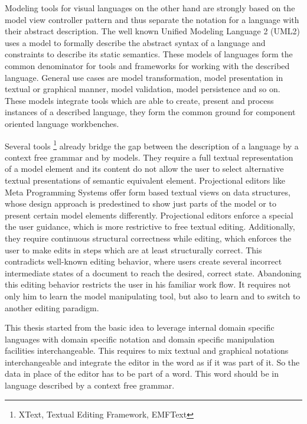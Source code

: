 Modeling tools for visual languages on the other hand are strongly based on the model view controller pattern and thus separate the notation for a language with their abstract description. The well known Unified Modeling Language 2 (UML2) uses a model to formally describe the abstract syntax of a language and constraints to describe its static semantics. These models of languages form the common denominator for tools and frameworks for working with the described language. General use cases are model transformation, model presentation in textual or graphical manner, model validation, model persistence and so on. These models integrate tools which are able to create, present and process instances of a described language, they form the common ground for component oriented language workbenches. 

Several tools \footnote{\raggedright XText, Textual Editing Framework, EMFText} already bridge the gap between the description of a language by a context free grammar and by models. They require a full textual representation of a model element and its content do not allow the user to select alternative textual presentations of semantic equivalent element. Projectional editors like Meta Programming Systems offer form based textual views on data structures, whose design approach is 	 predestined to show just parts of the model or to present certain model elements differently. Projectional editors enforce a special the user guidance, which is more restrictive to free textual editing. Additionally, they require continuous structural correctness while editing, which enforces the user to make edits in steps which are at least structurally correct. This contradicts well-known editing behavior, where users create several incorrect intermediate states of a document to reach the desired, correct state. Abandoning this editing behavior restricts the user in his familiar work flow. It requires not only him to learn the model manipulating tool, but also to learn and to switch to another editing paradigm. 

This thesis started from the basic idea to leverage internal domain specific languages with domain specific notation and domain specific manipulation facilities interchangeable. This requires to mix textual and graphical notations interchangeable and integrate the editor in the word as if it was part of it. So the data in place of the editor has to be part of a word. This word should be in language described by a context free grammar.


